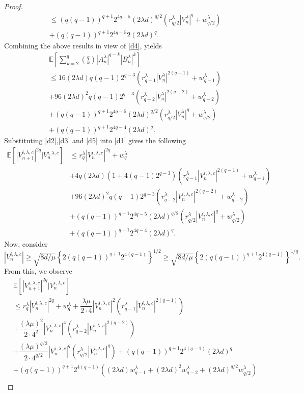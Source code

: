\documentclass[a4paper, 10pt]{article}
\theoremstyle{plain}%
\begin{document}
\begin{proof}
\begin{align*}
&\leq (q(q-1))^{q+1}2^{4q-5}(2\lambda d)^{q/2}\left(r^{\lambda}_{q/2}|V_n^{\lambda}|^q+w^{\lambda}_{q/2}\right)\\
&+(q(q-1))^{q+1}2^{4q-5}2(2\lambda d)^q.
\end{align*}
Combining the above results in view of \eqref{d4}, yields
\begin{align}
&\mathbb{E}\left[\sum_{k=2}^q\binom{q}{k}|A_n^{\lambda}|^{q-k}|B^{\lambda}_n|^k\right]\nonumber\\
&\leq 16(2\lambda d)q(q-1)2^{q-3} \left(r_{q-1}^{\lambda}|V_n^{\lambda}|^{2(q-1)}+w_{q-1}^{\lambda}\right)\nonumber\\&+96(2\lambda d)^2q(q-1)2^{q-3} \left(r_{q-2}^{\lambda}|V_n^{\lambda}|^{2(q-2)}+w_{q-2}^{\lambda}\right)\nonumber\\
&+ (q(q-1))^{q+1}2^{4q-5}(2\lambda d)^{q/2}\left(r^{\lambda}_{q/2}|V_n^{\lambda}|^q+w^{\lambda}_{q/2}\right)\nonumber\\
&+(q(q-1))^{q+1}2^{4q-4}(2\lambda d)^q.\label{d5}
\end{align}
Substituting \eqref{d2},\eqref{d3} and \eqref{d5} into \eqref{d1} gives the following
\begin{align}
\mathbb{E}\left[|V^{i,\lambda,c}_{n+1}|^{2q}|V^{i,\lambda,c}_{n}\right]&\leq r_q^{\lambda}|V^{i,\lambda,c}_{n}|^{2q}+w_q^{\lambda}\nonumber\\
&+4q\left(2\lambda d\right)(1+4(q-1)2^{q-3}) \left(r_{q-1}^{\lambda}|V^{i,\lambda,c}_{n}|^{2(q-1)}+w_{q-1}^{\lambda}\right)\nonumber\\
&+96(2\lambda d)^2q(q-1)2^{q-3} \left(r_{q-2}^{\lambda}|V^{i,\lambda,c}_{n}|^{2(q-2)}+w_{q-2}^{\lambda}\right)\nonumber\\
&+ (q(q-1))^{q+1}2^{4q-5}(2\lambda d)^{q/2}\left(r^{\lambda}_{q/2}|V^{i,\lambda,c}_{n}|^q+w^{\lambda}_{q/2}\right)\nonumber\\
&+(q(q-1))^{q+1}2^{4q-4}(2\lambda d)^q.\label{d6}
\end{align}
Now, consider $$|V^{i,\lambda,c}_{n}|\geq \sqrt{8d/\mu}\left\{2(q(q-1))^{q+1}2^{4(q-1)}\right\}^{1/2}\geq \sqrt{8d/\mu}\left\{2(q(q-1))^{q+1}2^{4(q-1)}\right\}^{1/q}.$$ From this, we observe
\begin{align*}
&\mathbb{E}\left[|V^{i,\lambda,c}_{n+1}|^{2q}|V^{i,\lambda,c}_{n}\right]\\&\leq r_q^{\lambda}|V_n^{i,\lambda,c}|^{2q}+w_q^{\lambda}+\dfrac{\lambda\mu}{2\cdot 4}|V^{i,\lambda,c}_{n}|^2\left(r_{q-1}^{\lambda}|V^{i,\lambda,c}_{n}|^{2(q-1)}\right)\\
&+\dfrac{(\lambda\mu)^2}{2\cdot 4^2}|V^{i,\lambda,c}_{n}|^4\left(r_{q-2}^{\lambda}|V^{i,\lambda,c}_{n}|^{2(q-2)}\right)\\&+\dfrac{(\lambda\mu)^{q/2}}{2\cdot 4^{q/2}}|V_n^{i,\lambda,c}|^{q}\left(r^{\lambda}_{q/2}|V_n^{i,\lambda,c}|^q\right)+(q(q-1))^{q+1}2^{4(q-1)}(2\lambda d)^q\\&+(q(q-1))^{q+1}2^{4(q-1)}\left((2\lambda d)w_{q-1}^{\lambda}+(2\lambda d)^2w_{q-2}^{\lambda}+(2\lambda d)^{q/2}w_{q/2}^{\lambda}\right)\\

\end{align*}
\end{proof}
\end{document}
